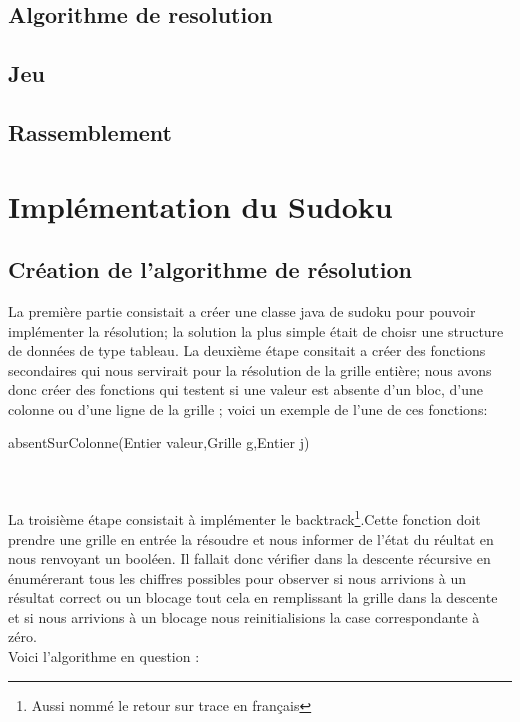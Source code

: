 \documentclass{article}
\begin{document}
\subsection{Algorithme de resolution}
\subsection{Jeu}
\subsection{Rassemblement}


\section{Implémentation du Sudoku}

\subsection{Création de l'algorithme de résolution}

La première partie consistait a créer une classe java de sudoku pour pouvoir implémenter la résolution; la solution la plus simple était de choisr une structure de données de type tableau.
\newline
\newline La deuxième étape consitait a créer des fonctions secondaires qui nous servirait pour la résolution de la grille entière; nous avons donc créer des fonctions qui testent si une valeur est absente d'un bloc, d'une colonne ou d'une ligne de la grille ; voici un exemple de l'une de ces fonctions:\\


\begin{algorithm}[H]
\SetAlgoLined
{}
\caption{absentSurColonne(Entier valeur,Grille g,Entier j)}
\end{algorithm}\\\\


La troisième étape consistait à implémenter le backtrack\footnote{Aussi nommé le retour sur trace en français}.Cette fonction doit prendre une grille en entrée la résoudre et nous informer de l'état du réultat en nous renvoyant un booléen.
Il fallait donc vérifier dans la descente récursive en énumérerant tous les chiffres possibles pour observer si nous arrivions à un résultat correct ou un blocage tout cela en remplissant la grille dans la descente et si nous arrivions à un blocage nous reinitialisions la case correspondante à zéro.\\
Voici l'algorithme en question :
\end{document}

